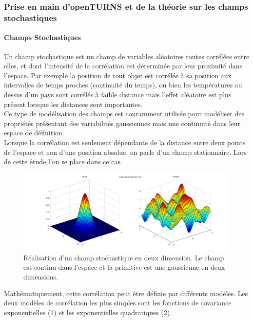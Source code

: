 \documentclass[a4paper,10pt]{article}
\begin{document}
\subsubsection{Prise en main d'openTURNS et de la théorie sur les champs stochastiques}
\paragraph{Champs Stochastiques\\} 
Un champ stochastique est un champ de variables aléatoires toutes corrélées entre elles, et dont l'intensité de la corrélation est déterminée par leur proximité dans l'espace. Par exemple la position de tout objet est corrélée à sa position aux intervalles de temps proches (continuité du temps), ou bien les températures au dessus d'un pays sont corrélés à faible distance mais l'effet aléatoire est plus présent lorsque les distances sont importantes. \\
Ce type de modélisation des champs est couramment utilisée pour modéliser des propriétés présentant des variabilités gaussiennes mais une continuité dans leur espace de définition. \\ Lorsque la corrélation est seulement dépendante de la distance entre deux points de l'espace et non d'une position absolue, on parle d'un champ stationnaire. Lors de cette étude l'on se place dans ce cas.\\ 

\newpage

\begin{figure}[H]
   \centering   \includegraphics[scale=0.25]{stochastic_process2d.png}
      \caption{Réalisation d'un champ stochastique en deux dimension. Le champ est continu dans l'espace et la primitive est une gaussienne en deux dimensions.}
         \label{realChamp}
\end{figure}

Mathématiquement, cette corrélation peut être définie par différents modèles. Les deux modèles de corrélation les plus simples sont les fonctions de covariance exponentielles (1) et les exponentielles quadratiques (2).  
\end{document}
